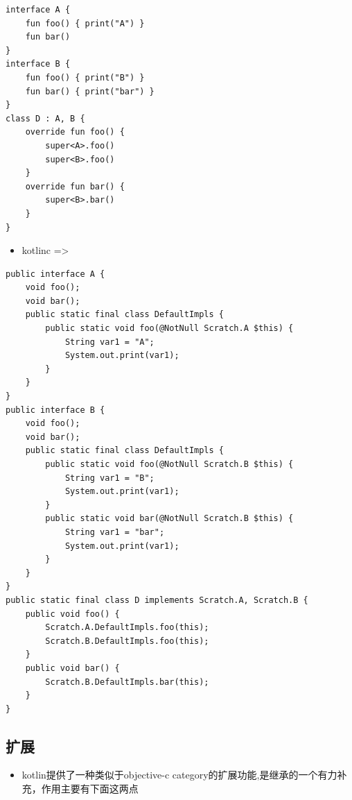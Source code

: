 \documentclass[9pt, b5paper]{article}
\begin{document}
\begin{verbatim}
interface A {
    fun foo() { print("A") }
    fun bar()
}
interface B {
    fun foo() { print("B") }
    fun bar() { print("bar") }
}
class D : A, B {
    override fun foo() {
        super<A>.foo()
        super<B>.foo()
    }
    override fun bar() {
        super<B>.bar()
    }
}
\end{verbatim}
\begin{itemize}
\item kotlinc =>
\end{itemize}
\begin{verbatim}
public interface A {
    void foo();
    void bar();
    public static final class DefaultImpls {
        public static void foo(@NotNull Scratch.A $this) {
            String var1 = "A";
            System.out.print(var1);
        }
    }
}
public interface B {
    void foo();
    void bar();
    public static final class DefaultImpls {
        public static void foo(@NotNull Scratch.B $this) {
            String var1 = "B";
            System.out.print(var1);
        }
        public static void bar(@NotNull Scratch.B $this) {
            String var1 = "bar";
            System.out.print(var1);
        }
    }
}
public static final class D implements Scratch.A, Scratch.B {
    public void foo() {
        Scratch.A.DefaultImpls.foo(this);
        Scratch.B.DefaultImpls.foo(this);
    }
    public void bar() {
        Scratch.B.DefaultImpls.bar(this);
    }
}
\end{verbatim}
\subsection{扩展}
\label{sec-7-7}
\begin{itemize}
\item kotlin提供了一种类似于objective-c category的扩展功能,是继承的一个有力补充，作用主要有下面这两点
\end{itemize}
\end{document}
